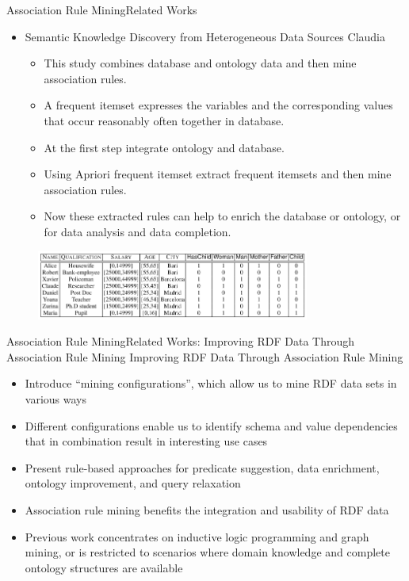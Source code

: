 \documentclass[10pt]{beamer}
\begin{document}
\begin{frame}{Association Rule Mining}{Related Works}
\begin{itemize}
\item Semantic Knowledge Discovery from Heterogeneous Data Sources
Claudia \cite{d2012semantic}
\begin{itemize}
\item This study combines database and ontology data and then mine association rules.
\item A frequent itemset expresses the variables and the corresponding values that occur reasonably often together in database.
\item At the first step integrate ontology and database.
\item Using Apriori frequent itemset extract frequent itemsets and then mine association rules. 
\item Now these extracted rules can help to enrich the database or ontology, or for data analysis and data completion.
\end{itemize}
\end{itemize}
\begin{figure}[H]
	\centering
	\includegraphics[width=0.8\textwidth]{images/Database.PNG}
	\label{fig:Database}
 
\end{figure}
\end{frame}

\begin{frame}{Association Rule Mining}{Related Works:  Improving RDF Data Through Association Rule Mining}
Improving RDF Data Through Association Rule Mining \cite{abedjan2013improving}
\begin{itemize}
	
	\item Introduce “mining configurations”, which allow us to mine RDF data sets in various ways
	\item Different configurations enable us to identify schema and value dependencies that in combination result in interesting use cases
	\item Present rule-based approaches for predicate suggestion, data enrichment, ontology improvement, and query relaxation
	\item Association rule mining benefits the integration and usability of RDF data
	\item Previous work concentrates on inductive logic programming and graph mining, or is restricted to scenarios where domain knowledge and complete ontology structures are available
\end{itemize}
\end{frame}
 
\end{document}
